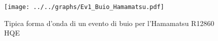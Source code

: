 \begin{figure}[h] \centering \texttt{[image: ../../graphs/Ev1\_Buio\_Hamamatsu.pdf]}\caption{Tipica forma d'onda di un evento di buio per l'Hamamatsu R12860 HQE}\label{gr:Ev1_Buio_Hamamatsu} \end{figure}

